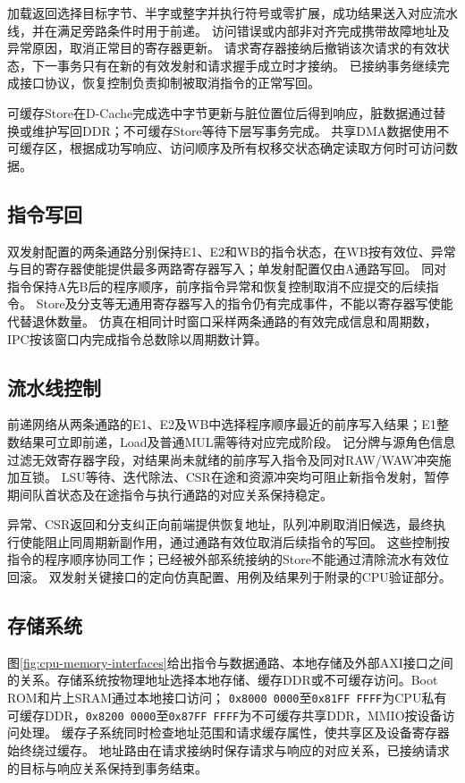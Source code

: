 加载返回选择目标字节、半字或整字并执行符号或零扩展，成功结果送入对应流水线，并在满足旁路条件时用于前递。
访问错误或内部非对齐完成携带故障地址及异常原因，取消正常目的寄存器更新。
请求寄存器接纳后撤销该次请求的有效状态，下一事务只有在新的有效发射和请求握手成立时才接纳。
已接纳事务继续完成接口协议，恢复控制负责抑制被取消指令的正常写回。

可缓存Store在D-Cache完成选中字节更新与脏位置位后得到响应，脏数据通过替换或维护写回DDR；不可缓存Store等待下层写事务完成。
共享DMA数据使用不可缓存区，根据成功写响应、访问顺序及所有权移交状态确定读取方何时可访问数据。

\subsection{指令写回}

双发射配置的两条通路分别保持E1、E2和WB的指令状态，在WB按有效位、异常与目的寄存器使能提供最多两路寄存器写入；单发射配置仅由A通路写回。
同对指令保持A先B后的程序顺序，前序指令异常和恢复控制取消不应提交的后续指令。
Store及分支等无通用寄存器写入的指令仍有完成事件，不能以寄存器写使能代替退休数量。
仿真在相同计时窗口采样两条通路的有效完成信息和周期数，IPC按该窗口内完成指令总数除以周期数计算。

\subsection{流水线控制}

前递网络从两条通路的E1、E2及WB中选择程序顺序最近的前序写入结果；E1整数结果可立即前递，Load及普通MUL需等待对应完成阶段。
记分牌与源角色信息过滤无效寄存器字段，对结果尚未就绪的前序写入指令及同对RAW/WAW冲突施加互锁。
LSU等待、迭代除法、CSR在途和资源冲突均可阻止新指令发射，暂停期间队首状态及在途指令与执行通路的对应关系保持稳定。

异常、CSR返回和分支纠正向前端提供恢复地址，队列冲刷取消旧候选，最终执行使能阻止同周期新副作用，通过通路有效位取消后续指令的写回。
这些控制按指令的程序顺序协同工作；已经被外部系统接纳的Store不能通过清除流水有效位回滚。
双发射关键接口的定向仿真配置、用例及结果列于附录的CPU验证部分。


\subsection{存储系统}

图\ref{fig:cpu-memory-interfaces}给出指令与数据通路、本地存储及外部AXI接口之间的关系。存储系统按物理地址选择本地存储、缓存DDR或不可缓存访问。Boot ROM和片上SRAM通过本地接口访问；
\texttt{0x8000\,0000}至\texttt{0x81FF\,FFFF}为CPU私有可缓存DDR，\texttt{0x8200\,0000}至\texttt{0x87FF\,FFFF}为不可缓存共享DDR，MMIO按设备访问处理。
缓存子系统同时检查地址范围和请求缓存属性，使共享区及设备寄存器始终绕过缓存。
地址路由在请求接纳时保存请求与响应的对应关系，已接纳请求的目标与响应关系保持到事务结束。

